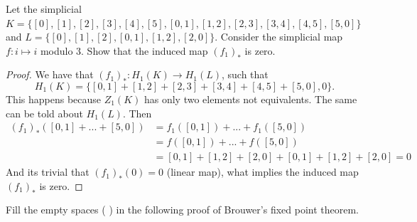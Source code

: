 \noindent\linia

\begin{exercise}
    Let the simplicial $K = \{[0], [1], [2], [3], [4], [5], [0, 1], [1, 2], [2, 3], [3, 4],
    [4, 5], [5, 0]\}$ and  $L = \{[0], [1], [2], [0, 1], [1, 2], [2, 0]\}$.
    Consider the simplicial map $f : i \mapsto i$ modulo 3. Show that the induced map $(f_1)_*$ is zero.
\end{exercise}

\begin{proof}
    We have that $(f_1)_* : H_1(K) \to H_1(L)$, such that $$H_1(K) = \{[0,1] +
    [1,2]+ [2,3] + [3,4] + [4,5] + [5,0], 0\}.$$
    This happens because $Z_1(K)$ has only two elements not equivalents. The
    same can be told about $H_1(L)$. Then 
    \begin{equation*}
        \begin{split}
            (f_1)_*([0,1] + ... + [5,0]) &= f_1([0,1]) + ... + f_1([5,0]) \\
            &= f([0,1]) + ... + f([5,0]) \\
            &= [0,1] + [1,2] + [2,0] + [0,1] + [1,2] + [2,0] = 0
        \end{split}
    \end{equation*}
    And its trivial that $(f_1)_*(0) = 0$ (linear map), what implies the induced map $(f_1)_*$ is zero.
\end{proof}

\noindent\linia

\begin{exercise}
    Fill the empty spaces ( ) in the following proof of Brouwer’s fixed point theorem.
\end{exercise}

